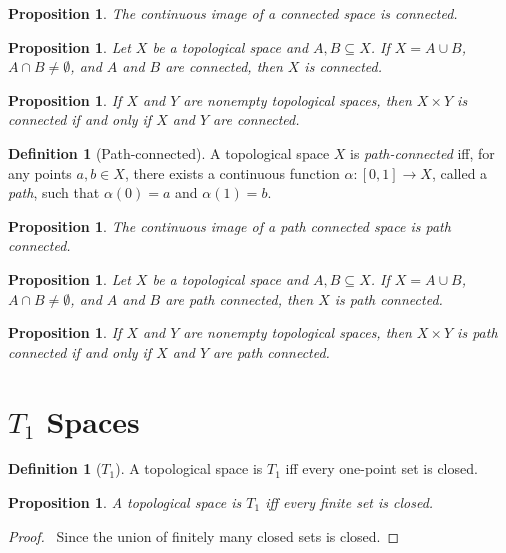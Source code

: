 \documentclass{book}
\let\qed\relax
\newtheorem{prop}[ax]{Proposition}
\theoremstyle{definition}
\newtheorem{df}[ax]{Definition}
\begin{document}
\begin{prop}
The continuous image of a connected space is connected.
\end{prop}

\begin{prop}
Let $X$ be a topological space and $A,B \subseteq X$. If $X = A \cup B$, $A \cap B \neq \emptyset$, and $A$ and $B$ are connected, then $X$ is connected.
\end{prop}

\begin{prop}
If $X$ and $Y$ are nonempty topological spaces, then
$X \times Y$ is connected if and only if $X$ and $Y$ are connected.
\end{prop}

\begin{df}[Path-connected]
A topological space $X$ is \emph{path-connected} iff, for any points $a,b \in X$, there exists a continuous function $\alpha : [0,1] \rightarrow X$, called a \emph{path}, such that $\alpha(0) = a$ and $\alpha(1) = b$.
\end{df}

\begin{prop}
The continuous image of a path connected space is path connected.
\end{prop}

\begin{prop}
Let $X$ be a topological space and $A,B \subseteq X$. If $X = A \cup B$, $A \cap B \neq \emptyset$, and $A$ and $B$ are path connected, then $X$ is path connected.
\end{prop}

\begin{prop}
If $X$ and $Y$ are nonempty topological spaces, then
$X \times Y$ is path connected if and only if $X$ and $Y$ are path connected.
\end{prop}

\section{$T_1$ Spaces}

\begin{df}[$T_1$]
A topological space is $T_1$ iff every one-point set is closed.
\end{df}

\begin{prop}
A topological space is $T_1$ iff every finite set is closed.
\end{prop}

\begin{proof}
\pf\ Since the union of finitely many closed sets is closed. \qed
\end{proof}
\end{document}
